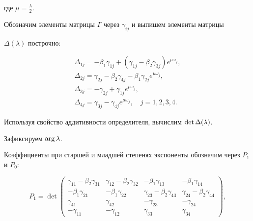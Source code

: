 где $\mu=\frac{\lambda}{2}$.





Обозначим  элементы матрицы $\Gamma$ через $\gamma_{ij}$ и выпишем элементы матрицы 

$\Delta(\lambda)$ построчно:  

$$

\begin{array}{l}

\Delta_{1j}=-\beta_1\gamma_{1j}+(\gamma_{1j}-\beta_2\gamma_{3j})e^{\mu\omega_j}, \\[1mm]

\Delta_{2j}=\gamma_{2j}-\beta_2\gamma_{4j}-\beta_1\gamma_{2j}e^{\mu\omega_j},\\[1mm]

\Delta_{3j}=-\gamma_{2j}+\gamma_{1j}e^{\mu\omega_j}, \\[1mm]

\Delta_{4j}=\gamma_{3j}-\gamma_{4j}e^{\mu\omega_j},\quad  j=1, 2, 3, 4.

\end{array}

$$





Используя свойство аддитивности определителя,  вычислим  $\mathop{\rm det} \Delta(\lambda)$.  

Зафиксируем $\mathop{\rm arg} \lambda$. 

Коэффициенты при старшей и младшей степенях экспоненты обозначим  через $P_1$ и $P_0$:

$$

  P_1=\det\begin{pmatrix}

 \gamma_{11}-\beta_2\gamma_{31} & \gamma_{12}-\beta_2\gamma_{32} & -\beta_1\gamma_{13} & -\beta_1\gamma_{14} \\

-\beta_1\gamma_{21}  & -\beta_1\gamma_{22} & \gamma_{23}-\beta_2\gamma_{43} & \gamma_{24}-\beta_2\gamma_{44} \\

\gamma_{41} & \gamma_{42} & -\gamma_{23} & -\gamma_{24}\\

-\gamma_{11} & -\gamma_{12} & \gamma_{33} & \gamma_{34}

\end{pmatrix},

$$

$$

